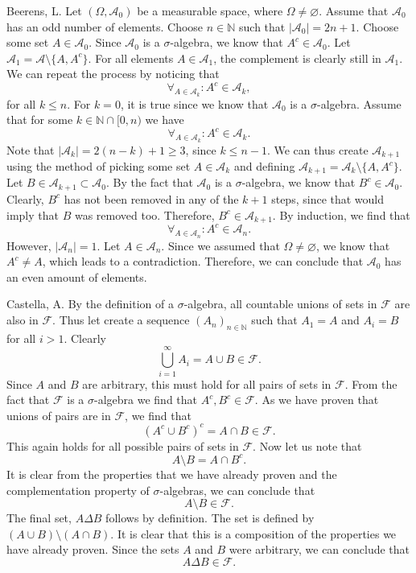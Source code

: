 \begin{solution}[2.1]{Beerens, L.}
    Let $(\Omega, \mathcal{A}_0)$ be a measurable space, where $\Omega\neq\varnothing$. Assume that $\mathcal{A}_0$ has an odd number of elements. Choose $n\in\mathbb{N}$ such that $|\mathcal{A}_0|=2n+1$. Choose some set $A\in \mathcal{A}_0$. Since $\mathcal{A}_0$ is a $\sigma$-algebra, we know that $A^c\in\mathcal{A}_0$. Let $\mathcal{A}_1 = \mathcal{A}\setminus\{A, A^c\}$.
    For all elements $A\in\mathcal{A}_1$, the complement is clearly still in $\mathcal{A}_1$.
    We can repeat the process by noticing that
    $$
        \forall_{A\in\mathcal{A}_k}: A^c\in\mathcal{A}_k,
    $$
    for all $k\leq n$.
    For $k=0$, it is true since we know that $\mathcal{A}_0$ is a $\sigma$-algebra. Assume that for some $k\in\mathbb{N}\cap[0,n)$ we have
    $$
        \forall_{A\in\mathcal{A}_k}: A^c\in\mathcal{A}_k.
    $$
    Note that $|\mathcal{A}_k|=2(n-k)+1\geq 3$, since $k\leq n -1$. We can thus create $\mathcal{A}_{k+1}$ using the method of picking some set $A\in\mathcal{
    A}_{k}$ and defining $\mathcal{A}_{k+1} = \mathcal{A}_k\setminus\{A, A^c\}$. Let $B\in\mathcal{A}_{k+1}\subset\mathcal{A}_0$. By the fact that $\mathcal{A}_0$ is a $\sigma$-algebra, we know that $B^c\in\mathcal{A_0}$. Clearly, $B^c$ has not been removed in any of the $k+1$ steps, since that would imply that $B$ was removed too. Therefore, $B^c\in\mathcal{A}_{k+1}$. By induction, we find that
    $$
        \forall_{A\in\mathcal{A}_n}: A^c\in\mathcal{A}_n.
    $$
    However, $|\mathcal{A}_n|=1$. Let $A\in\mathcal{A}_n$. Since we assumed that $\Omega\neq \varnothing$, we know that $A^c\neq A$, which leads to a contradiction. Therefore, we can conclude that $\mathcal{A}_0$ has an even amount of elements.
\end{solution}

\begin{solution}[2.2]{Castella, A.}
    By the definition of a $\sigma$-algebra, all countable unions of sets in $\mathcal{F}$ are also in $\mathcal{F}$. Thus let create a sequence $(A_n)_{n\in\mathbb{N}}$ such that $A_1 = A$ and $A_i = B$ for all $i > 1$. Clearly
    $$
        \bigcup_{i=1}^\infty A_i = A\cup B \in \mathcal{F}.
    $$
    Since $A$ and $B$ are arbitrary, this must hold for all pairs of sets in $\mathcal{F}$. From the fact that $\mathcal{F}$ is a $\sigma$-algebra we find that $A^c,B^c \in \mathcal{F}$. As we have proven that unions of pairs are in $\mathcal{F}$, we find that
    $$
        (A^c \cup B^c)^c = A\cap B \in \mathcal{F}.
    $$
    This again holds for all possible pairs of sets in $\mathcal{F}$. Now let us note that
    $$
        A\setminus B = A\cap B^c.
    $$
    It is clear from the properties that we have already proven and the complementation property of $\sigma$-algebras, we can conclude that
    $$
        A\setminus B \in \mathcal{F}.
    $$
    The final set, $A\Delta B$ follows by definition. The set is defined by $(A\cup B)\setminus (A\cap B)$. It is clear that this is a composition of the properties we have already proven. Since the sets $A$ and $B$ were arbitrary, we can conclude that
    $$
        A\Delta B \in \mathcal{F}.
    $$
\end{solution}


